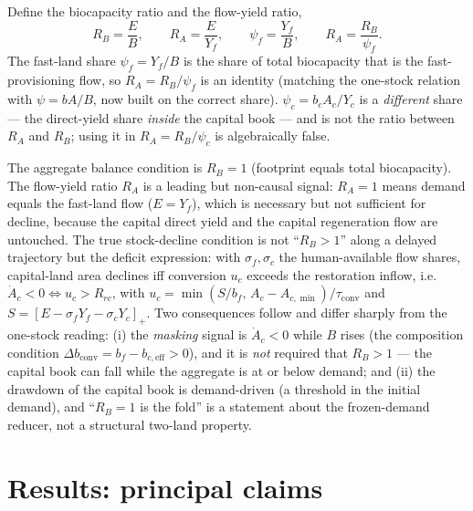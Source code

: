\documentclass[11pt]{article}
\begin{document}
Define the biocapacity ratio and the flow-yield ratio,
\[
R_B=\frac{E}{B},\qquad R_A=\frac{E}{Y_f},\qquad \psi_f=\frac{Y_f}{B},\qquad R_A=\frac{R_B}{\psi_f}.
\]
\noindent The fast-land share $\psi_f=Y_f/B$ is the share of total biocapacity that is the fast-provisioning flow, so $R_A=R_B/\psi_f$ is an identity (matching the one-stock relation with $\psi=bA/B$, now built on the correct share). $\psi_c=b_cA_c/Y_c$ is a \emph{different} share --- the direct-yield share \emph{inside} the capital book --- and is not the ratio between $R_A$ and $R_B$; using it in $R_A=R_B/\psi_c$ is algebraically false.
\par The aggregate balance condition is $R_B=1$ (footprint equals total biocapacity). The flow-yield ratio $R_A$ is a leading but non-causal signal: $R_A=1$ means demand equals the fast-land flow ($E=Y_f$), which is necessary but not sufficient for decline, because the capital direct yield and the capital regeneration flow are untouched. The true stock-decline condition is not ``$R_B>1$'' along a delayed trajectory but the deficit expression: with $\sigma_f,\sigma_c$ the human-available flow shares, capital-land area declines iff conversion $u_c$ exceeds the restoration inflow, i.e.\ $\dot A_c<0\iff u_c>R_{rc}$, with $u_c=\min(S/b_f,\,A_c-A_{c,\min})/\tau_{\mathrm{conv}}$ and $S=[E-\sigma_fY_f-\sigma_cY_c]_+$. Two consequences follow and differ sharply from the one-stock reading: (i) the \emph{masking} signal is $\dot A_c<0$ while $B$ rises (the composition condition $\Delta b_{\mathrm{conv}}=b_f-b_{c,\mathrm{eff}}>0$), and it is \emph{not} required that $R_B>1$ --- the capital book can fall while the aggregate is at or below demand; and (ii) the drawdown of the capital book is demand-driven (a threshold in the initial demand), and ``$R_B=1$ is the fold'' is a statement about the frozen-demand reducer, not a structural two-land property.

\section{Results: principal claims}
\end{document}
